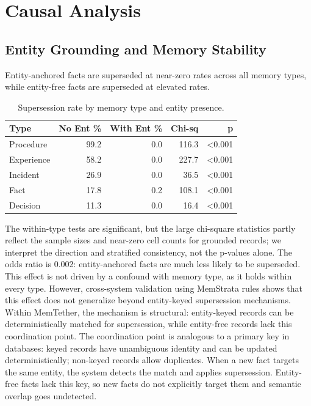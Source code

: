 \documentclass[sigconf,nonacm]{acmart}
\begin{document}
\section{Causal Analysis}
\label{sec:causal}

\subsection{Entity Grounding and Memory Stability}
\label{sec:entity}

Entity-anchored facts are superseded at near-zero rates across all memory types, while entity-free facts are superseded at elevated rates.

\begin{table}[h]
\centering
\caption{Supersession rate by memory type and entity presence.}
\begin{tabular}{lrrrr}
\toprule
Type & No Ent \% & With Ent \% & Chi-sq & p \\
\midrule
Procedure & 99.2 & 0.0 & 116.3 & <0.001 \\
Experience & 58.2 & 0.0 & 227.7 & <0.001 \\
Incident & 26.9 & 0.0 & 36.5 & <0.001 \\
Fact & 17.8 & 0.2 & 108.1 & <0.001 \\
Decision & 11.3 & 0.0 & 16.4 & <0.001 \\
\bottomrule
\end{tabular}
\end{table}

The within-type tests are significant, but the large chi-square statistics partly reflect the sample sizes and near-zero cell counts for grounded records; we interpret the direction and stratified consistency, not the p-values alone. The odds ratio is 0.002: entity-anchored facts are much less likely to be superseded. This effect is not driven by a confound with memory type, as it holds within every type. However, cross-system validation using MemStrata rules shows that this effect does not generalize beyond entity-keyed supersession mechanisms. Within MemTether, the mechanism is structural: entity-keyed records can be deterministically matched for supersession, while entity-free records lack this coordination point. The coordination point is analogous to a primary key in databases: keyed records have unambiguous identity and can be updated deterministically; non-keyed records allow duplicates. When a new fact targets the same entity, the system detects the match and applies supersession. Entity-free facts lack this key, so new facts do not explicitly target them and semantic overlap goes undetected.
\end{document}
